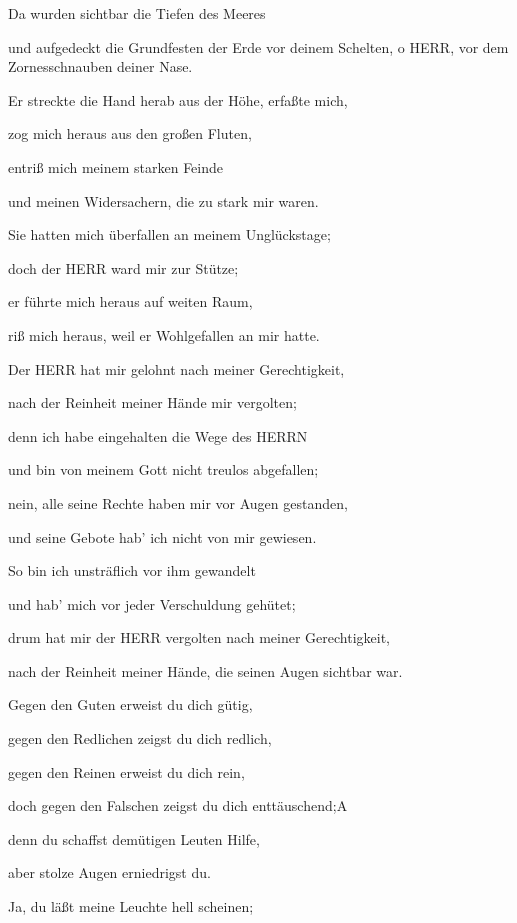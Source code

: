 Da wurden sichtbar die Tiefen des Meeres

und aufgedeckt die Grundfesten der Erde vor deinem Schelten, o HERR, vor
dem Zornesschnauben deiner Nase.

Er streckte die Hand herab aus der Höhe, erfaßte mich,

zog mich heraus aus den großen Fluten,

entriß mich meinem starken Feinde

und meinen Widersachern, die zu stark mir waren.

Sie hatten mich überfallen an meinem Unglückstage;

doch der HERR ward mir zur Stütze;

er führte mich heraus auf weiten Raum,

riß mich heraus, weil er Wohlgefallen an mir hatte.

Der HERR hat mir gelohnt nach meiner Gerechtigkeit,

nach der Reinheit meiner Hände mir vergolten;

denn ich habe eingehalten die Wege des HERRN

und bin von meinem Gott nicht treulos abgefallen;

nein, alle seine Rechte haben mir vor Augen gestanden,

und seine Gebote hab' ich nicht von mir gewiesen.

So bin ich unsträflich vor ihm gewandelt

und hab' mich vor jeder Verschuldung gehütet;

drum hat mir der HERR vergolten nach meiner
Gerechtigkeit,

nach der Reinheit meiner Hände, die seinen Augen sichtbar war.

Gegen den Guten erweist du dich gütig,

gegen den Redlichen zeigst du dich redlich,

gegen den Reinen erweist du dich rein,

doch gegen den Falschen zeigst du dich enttäuschend;{A}

denn du schaffst demütigen Leuten Hilfe,

aber stolze Augen erniedrigst du.

Ja, du läßt meine Leuchte hell scheinen;

